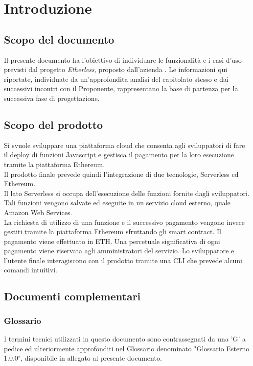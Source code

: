 \section{Introduzione}
\subsection{Scopo del documento}
	Il presente documento ha l'obiettivo di individuare le funzionalità e i casi d'uso previsti dal progetto \textit{Etherless}, proposto dall'azienda \Proponente{}. Le informazioni qui riportate, individuate da un'approfondita analisi del capitolato stesso e dai successivi incontri con il Proponente, rappresentano la base di partenza per la successiva fase di progettazione.

\subsection{Scopo del prodotto}
	Si svuole sviluppare una piattaforma cloud che consenta agli sviluppatori di fare il deploy di funzioni Javascript e gestisca il pagamento per la loro esecuzione tramite la piattaforma Ethereum.\\
	Il prodotto finale prevede quindi l'integrazione di due tecnologie, Serverless ed Ethereum.\\
	Il lato Serverless si occupa dell'esecuzione delle funzioni fornite dagli sviluppatori. Tali funzioni vengono salvate ed eseguite in un servizio cloud esterno, quale Amazon Web Services.  \\La richiesta di utilizzo di una funzione e il successivo pagamento vengono invece gestiti tramite la piattaforma Ethereum sfruttando gli smart contract. Il pagamento viene effettuato in ETH. Una percetuale significativa di ogni pagamento viene riservata agli amministratori del servizio. 
	Lo sviluppatore e l'utente finale interagiscono con il prodotto tramite una CLI che prevede alcuni comandi intuitivi.

\subsection{Documenti complementari}
\subsubsection{Glossario}
	I termini tecnici utilizzati in questo documento sono contrassegnati da una ’G’ a pedice ed ulteriormente approfonditi nel Glossario denominato "Glossario Esterno 1.0.0", disponibile in allegato al presente documento.

